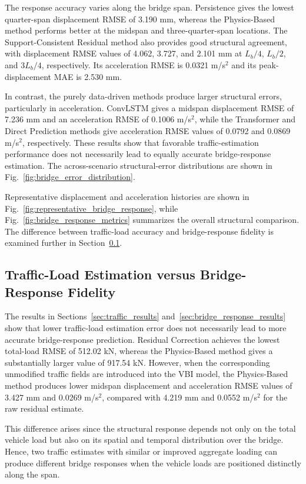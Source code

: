 \documentclass[journal]{IEEEtran}
\begin{document}
The response accuracy varies along the bridge span. Persistence gives the lowest quarter-span displacement RMSE of 3.190 mm, whereas the Physics-Based method performs better at the midspan and three-quarter-span locations. The Support-Consistent Residual method also provides good structural agreement, with displacement RMSE values of 4.062, 3.727, and 2.101 mm at $L_b/4$, $L_b/2$, and $3L_b/4$, respectively. Its acceleration RMSE is 0.0321 m/s$^2$ and its peak-displacement MAE is 2.530 mm.

In contrast, the purely data-driven methods produce larger structural errors, particularly in acceleration. ConvLSTM gives a midspan displacement RMSE of 7.236 mm and an acceleration RMSE of 0.1006 m/s$^2$, while the Transformer and Direct Prediction methods give acceleration RMSE values of 0.0792 and 0.0869 m/s$^2$, respectively. These results show that favorable traffic-estimation performance does not necessarily lead to equally accurate bridge-response estimation. The across-scenario structural-error distributions are shown in Fig.~\ref{fig:bridge_error_distribution}.

Representative displacement and acceleration histories are shown in Fig.~\ref{fig:representative_bridge_response}, while Fig.~\ref{fig:bridge_response_metrics} summarizes the overall structural comparison. The difference between traffic-load accuracy and bridge-response fidelity is examined further in Section~\ref{sec:load_response_fidelity}.

\subsection{Traffic-Load Estimation versus Bridge-Response Fidelity}
\label{sec:load_response_fidelity}

The results in Sections~\ref{sec:traffic_results} and~\ref{sec:bridge_response_results} show that lower traffic-load estimation error does not necessarily lead to more accurate bridge-response prediction. Residual Correction achieves the lowest total-load RMSE of 512.02 kN, whereas the Physics-Based method gives a substantially larger value of 917.54 kN. However, when the corresponding unmodified traffic fields are introduced into the VBI model, the Physics-Based method produces lower midspan displacement and acceleration RMSE values of 3.427 mm and 0.0269 m/s$^2$, compared with 4.219 mm and 0.0552 m/s$^2$ for the raw residual estimate.

This difference arises since the structural response depends not only on the total vehicle load but also on its spatial and temporal distribution over the bridge. Hence, two traffic estimates with similar or improved aggregate loading can produce different bridge responses when the vehicle loads are positioned distinctly along the span.
\end{document}
